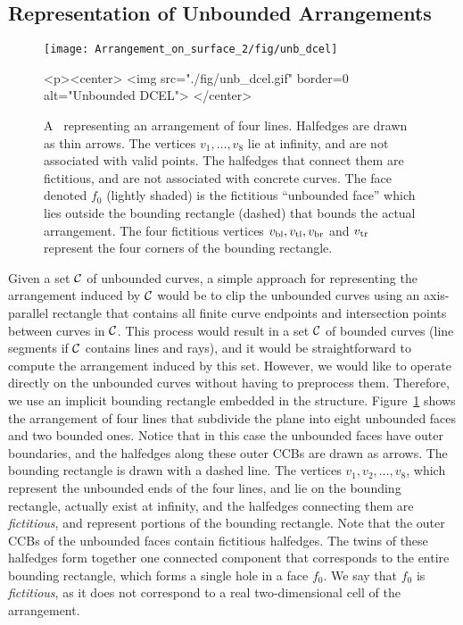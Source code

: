 \begin{ccAdvanced}

\subsection{Representation of Unbounded Arrangements\label{arr_ssec:unb_rep}}

\begin{figure}[t]
\begin{ccTexOnly}
  \begin{center}
  \texttt{[image: Arrangement\_on\_surface\_2/fig/unb\_dcel]}
  \end{center}
\end{ccTexOnly}
\begin{ccHtmlOnly}
  <p><center>
  <img src="./fig/unb_dcel.gif" border=0 alt="Unbounded DCEL">
  </center>
\end{ccHtmlOnly}
\caption{A \dcel\ representing an arrangement of four lines.
Halfedges are drawn as thin arrows. The vertices $v_1, \ldots, v_8$
lie at infinity, and are not associated with valid points. The
halfedges that connect them are fictitious, and are not associated
with concrete curves. The face denoted $f_0$ (lightly shaded)
is the fictitious ``unbounded face'' which lies outside the bounding
rectangle (dashed) that bounds the actual arrangement. The four
fictitious vertices $v_{\rm bl}, v_{\rm tl}, v_{\rm br}$ and
$v_{\rm tr}$ represent the four corners of the bounding
rectangle.\label{arr_fig:unb_dcel}}
\end{figure}

Given a set ${\cal C}$ of unbounded curves, a simple approach for
representing the arrangement induced by ${\cal C}$ would be to clip the
unbounded curves using an axis-parallel rectangle that contains all
finite curve endpoints and intersection points between curves in
${\cal C}$. This process would result in a set ${\cal C}$ of bounded curves
(line segments if ${\cal C}$ contains lines and rays), and it would be
straightforward to compute the arrangement induced by this set.
However, we would like to operate directly on the unbounded curves
without having to preprocess them. Therefore, we use an implicit
bounding rectangle embedded in the \dcel{} structure.
Figure~\ref{arr_fig:unb_dcel} shows the arrangement of four lines
that subdivide the plane into eight unbounded faces and two bounded
ones. Notice that in this case the unbounded faces have outer
boundaries, and the halfedges along these outer CCBs are drawn as 
arrows. The bounding rectangle is drawn with a dashed line. The
vertices $v_1,v_2,\ldots,v_8$, which represent the unbounded ends of 
the four lines, and lie on the bounding rectangle, actually exist at
infinity, and the halfedges connecting them are \emph{fictitious}, and
represent portions of the bounding rectangle. Note that the outer CCBs
of the unbounded faces contain fictitious halfedges. The twins of these
halfedges form together one connected component that corresponds to
the entire bounding rectangle, which forms a single hole in a face
$f_0$. We say that $f_0$ is \emph{fictitious}, as it does
not correspond to a real two-dimensional cell of the arrangement.


\end{ccAdvanced}
